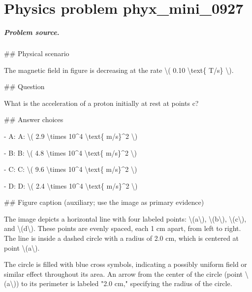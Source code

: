
\chapter{Physics problem phyx\_mini\_0927}
\label{ch:PhyXMiniProblems_problem_phyx_mini_0927}

\paragraph{Problem source.}
\#\# Physical scenario

The magnetic field in figure is decreasing at the rate \textbackslash{}( 0.10 \textbackslash{}text\{ T/s\} \textbackslash{}).

\#\# Question

What is the acceleration of a proton initially at rest at points c?

\#\# Answer choices

- A: A: \textbackslash{}( 2.9 \textbackslash{}times 10\textasciicircum{}4 \textbackslash{}text\{ m/s\}\textasciicircum{}2 \textbackslash{})

- B: B: \textbackslash{}( 4.8 \textbackslash{}times 10\textasciicircum{}4 \textbackslash{}text\{ m/s\}\textasciicircum{}2 \textbackslash{})

- C: C: \textbackslash{}( 9.6 \textbackslash{}times 10\textasciicircum{}4 \textbackslash{}text\{ m/s\}\textasciicircum{}2 \textbackslash{})

- D: D: \textbackslash{}( 2.4 \textbackslash{}times 10\textasciicircum{}4 \textbackslash{}text\{ m/s\}\textasciicircum{}2 \textbackslash{})

\#\# Figure caption (auxiliary; use the image as primary evidence)

The image depicts a horizontal line with four labeled points: \textbackslash{}(a\textbackslash{}), \textbackslash{}(b\textbackslash{}), \textbackslash{}(c\textbackslash{}), and \textbackslash{}(d\textbackslash{}). These points are evenly spaced, each 1 cm apart, from left to right. The line is inside a dashed circle with a radius of 2.0 cm, which is centered at point \textbackslash{}(a\textbackslash{}). 

The circle is filled with blue cross symbols, indicating a possibly uniform field or similar effect throughout its area. An arrow from the center of the circle (point \textbackslash{}(a\textbackslash{})) to its perimeter is labeled "2.0 cm," specifying the radius of the circle. 

